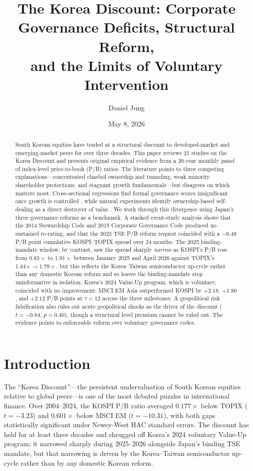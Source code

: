\documentclass[12pt]{article}
\title{The Korea Discount: Corporate Governance Deficits, Structural Reform,\\and the Limits of Voluntary Intervention}
\author{Daniel Jung}
\date{May 8, 2026}
\begin{document}
\maketitle

\begin{abstract}
South Korean equities have traded at a structural discount to developed-market and emerging-market peers for over three decades. This paper reviews 21 studies on the Korea Discount and presents original empirical evidence from a 20-year monthly panel of index-level price-to-book (P/B) ratios. The literature points to three competing explanations---concentrated chaebol ownership and tunneling, weak minority shareholder protections, and stagnant growth fundamentals---but disagrees on which matters most. Cross-sectional regressions find formal governance scores insignificant once growth is controlled \citep{yang2025korea}, while natural experiments identify ownership-based self-dealing as a direct destroyer of value \citep{black2015governance}. We work through this divergence using Japan's three governance reforms as a benchmark. A stacked event-study analysis shows that the 2014 Stewardship Code and 2015 Corporate Governance Code produced no sustained re-rating, and that the 2023 TSE P/B reform request coincided with a $-6.48$ P/B point cumulative KOSPI--TOPIX spread over 24 months. The 2025 binding-mandate window, by contrast, saw the spread sharply \emph{narrow} as KOSPI's P/B rose from $0.83\times$ to $1.91\times$ between January 2025 and April 2026 against TOPIX's $1.44\times \to 1.79\times$, but this reflects the Korea--Taiwan semiconductor up-cycle rather than any domestic Korean reform and so leaves the binding-mandate step uninformative in isolation. Korea's 2024 Value-Up program, which is voluntary, coincided with no improvement: MSCI EM Asia outperformed KOSPI by $+2.18$, $+1.80$, and $+2.12$ P/B points at $\tau=12$ across the three milestones. A geopolitical risk falsification also rules out acute geopolitical shocks as the driver of the discount ($t=-0.84$, $p=0.40$), though a structural level premium cannot be ruled out. The evidence points to enforceable reform over voluntary governance codes.
\end{abstract}

\section{Introduction}
\label{sec:intro}

The ``Korea Discount''---the persistent undervaluation of South Korean equities relative to global peers---is one of the most debated puzzles in international finance. Over 2004--2024, the KOSPI P/B ratio averaged $0.177\times$ below TOPIX ($t=-3.23$) and $0.601\times$ below MSCI EM ($t=-10.31$), with both gaps statistically significant under Newey-West HAC standard errors. The discount has held for at least three decades and shrugged off Korea's 2024 voluntary Value-Up program; it narrowed sharply during 2025--2026 alongside Japan's binding TSE mandate, but that narrowing is driven by the Korea--Taiwan semiconductor up-cycle rather than by any domestic Korean reform.
\end{document}
